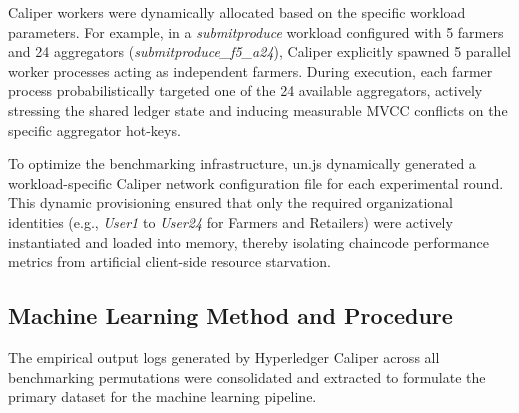 \documentclass[manuscript,screen,nofonts]{acmart}
\begin{document}
Caliper workers were dynamically allocated based on the specific workload parameters. For example, in a \textit{submitproduce} workload configured with 5 farmers and 24 aggregators (\textit{submitproduce\_f5\_a24}), Caliper explicitly spawned 5 parallel worker processes acting as independent farmers. During execution, each farmer process probabilistically targeted one of the 24 available aggregators, actively stressing the shared ledger state and inducing measurable MVCC conflicts on the specific aggregator hot-keys.

To optimize the benchmarking infrastructure, 
un.js dynamically generated a workload-specific Caliper network configuration file for each experimental round. This dynamic provisioning ensured that only the required organizational identities (e.g., \textit{User1} to \textit{User24} for Farmers and Retailers) were actively instantiated and loaded into memory, thereby isolating chaincode performance metrics from artificial client-side resource starvation.

\begin{table}[ht]
\centering
\caption{Benchmark Workload Configurations and Participant Mapping}
\label{tab:workload_mapping}
\end{table}


\subsection{Machine Learning Method and Procedure}

The empirical output logs generated by Hyperledger Caliper across all benchmarking permutations were consolidated and extracted to formulate the primary dataset for the machine learning pipeline.
\end{document}
